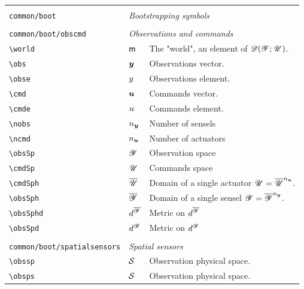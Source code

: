 \begin{longtable}{lll}
  &  & \\ 
 {\color[rgb]{0.5,0.5,0.5}\texttt{common/boot}} & \multicolumn{2}{l}{\emph{Bootstrapping symbols}}\\ 
 \hline
 &  & \\ 
 {\color[rgb]{0.5,0.5,0.5}\texttt{common/boot/obscmd}} & \multicolumn{2}{l}{\emph{Observations and commands}}\\ 
 \hline
{\color[rgb]{0.5,0.5,0.5}\texttt{\textbackslash world}} & $\textsf{m}$ &  The "world", an element of $\mathscr{D}(\mathscr{Y};\mathscr{U})$.\\ 
 {\color[rgb]{0.5,0.5,0.5}\texttt{\textbackslash obs}} & $\boldsymbol{y}$ &  Observations vector.\\ 
 {\color[rgb]{0.5,0.5,0.5}\texttt{\textbackslash obse}} & $y$ &  Observations element.\\ 
 {\color[rgb]{0.5,0.5,0.5}\texttt{\textbackslash cmd}} & $\boldsymbol{u}$ &  Commands vector.\\ 
 {\color[rgb]{0.5,0.5,0.5}\texttt{\textbackslash cmde}} & $u$ &  Commands element.\\ 
 {\color[rgb]{0.5,0.5,0.5}\texttt{\textbackslash nobs}} & ${n_{\boldsymbol{y}}}$ &  Number of sensels\\ 
 {\color[rgb]{0.5,0.5,0.5}\texttt{\textbackslash ncmd}} & ${n_{\boldsymbol{u}}}$ &  Number of actuators\\ 
 {\color[rgb]{0.5,0.5,0.5}\texttt{\textbackslash obsSp}} & $\mathscr{Y}$ &  Observation space \\ 
 {\color[rgb]{0.5,0.5,0.5}\texttt{\textbackslash cmdSp}} & $\mathscr{U}$ &  Commands space\\ 
 {\color[rgb]{0.5,0.5,0.5}\texttt{\textbackslash cmdSph}} & $\overline{\mathscr{U}}$ &  Domain of a single actuator $\mathscr{U}=\overline{\mathscr{U}}^{n_{\boldsymbol{u}}}$.\\ 
 {\color[rgb]{0.5,0.5,0.5}\texttt{\textbackslash obsSph}} & $\overline{\mathscr{Y}}$ &  Domain of a single sensel $\mathscr{Y}=\overline{\mathscr{Y}}^{n_{\boldsymbol{y}}}$.\\ 
 {\color[rgb]{0.5,0.5,0.5}\texttt{\textbackslash obsSphd}} & $d^{\overline{\mathscr{Y}}}$ &  Metric on $d^{\overline{\mathscr{Y}}}$\\ 
 {\color[rgb]{0.5,0.5,0.5}\texttt{\textbackslash obsSpd}} & $d^{\mathscr{Y}}$ &  Metric on $d^{\mathscr{Y}}$\\ 
  &  & \\ 
 {\color[rgb]{0.5,0.5,0.5}\texttt{common/boot/spatialsensors}} & \multicolumn{2}{l}{\emph{Spatial sensors}}\\ 
 \hline
{\color[rgb]{0.5,0.5,0.5}\texttt{\textbackslash obssp}} & $\obssp$ &  Observation physical space.\\ 
 {\color[rgb]{0.5,0.5,0.5}\texttt{\textbackslash obsps}} & $\obsps$ &  Observation physical space.\\ 

\end{longtable}

